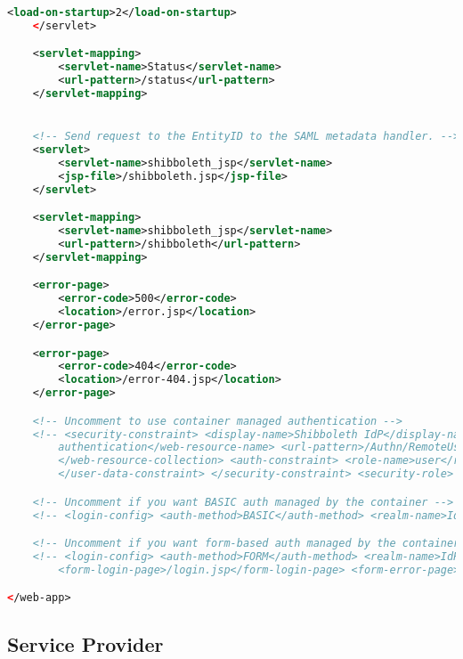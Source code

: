 \begin{lstlisting}[language=xml]
        <load-on-startup>2</load-on-startup>
    </servlet>

    <servlet-mapping>
        <servlet-name>Status</servlet-name>
        <url-pattern>/status</url-pattern>
    </servlet-mapping>


    <!-- Send request to the EntityID to the SAML metadata handler. -->
    <servlet>
        <servlet-name>shibboleth_jsp</servlet-name>
        <jsp-file>/shibboleth.jsp</jsp-file>
    </servlet>

    <servlet-mapping>
        <servlet-name>shibboleth_jsp</servlet-name>
        <url-pattern>/shibboleth</url-pattern>
    </servlet-mapping>

    <error-page>
        <error-code>500</error-code>
        <location>/error.jsp</location>
    </error-page>

    <error-page>
        <error-code>404</error-code>
        <location>/error-404.jsp</location>
    </error-page>

    <!-- Uncomment to use container managed authentication -->
    <!-- <security-constraint> <display-name>Shibboleth IdP</display-name> <web-resource-collection> <web-resource-name>user 
        authentication</web-resource-name> <url-pattern>/Authn/RemoteUser</url-pattern> <http-method>GET</http-method> <http-method>POST</http-method> 
        </web-resource-collection> <auth-constraint> <role-name>user</role-name> </auth-constraint> <user-data-constraint> <transport-guarantee>CONFIDENTIAL</transport-guarantee> 
        </user-data-constraint> </security-constraint> <security-role> <role-name>user</role-name> </security-role> -->

    <!-- Uncomment if you want BASIC auth managed by the container -->
    <!-- <login-config> <auth-method>BASIC</auth-method> <realm-name>IdP Password Authentication</realm-name> </login-config> -->

    <!-- Uncomment if you want form-based auth managed by the container -->
    <!-- <login-config> <auth-method>FORM</auth-method> <realm-name>IdP Password Authentication</realm-name> <form-login-config> 
        <form-login-page>/login.jsp</form-login-page> <form-error-page>/login-error.jsp</form-error-page> </form-login-config> </login-config> -->

</web-app>
\end{lstlisting}

\subsection{Service Provider}
